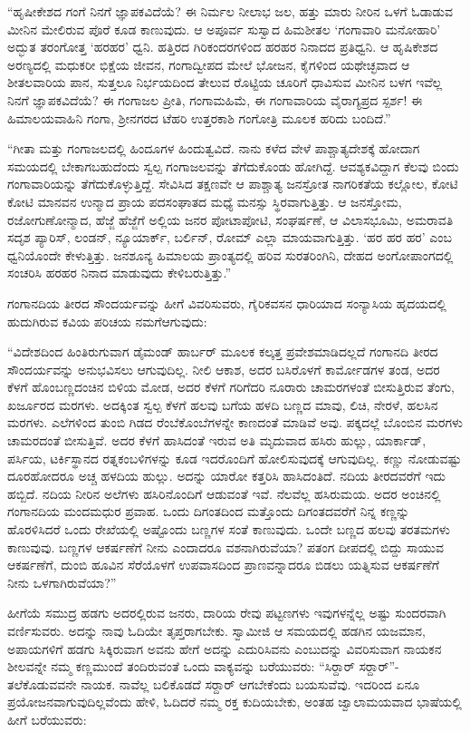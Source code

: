  “ಹೃಷೀಕೇಶದ ಗಂಗೆ ನಿನಗೆ ಜ್ಞಾಪಕವಿದೆಯೆ? ಈ ನಿರ್ಮಲ ನೀಲಾಭ ಜಲ, ಹತ್ತು ಮಾರು ನೀರಿನ ಒಳಗೆ ಓಡಾಡುವ ಮೀನಿನ ಮೇಲಿರುವ ಪೊರೆ ಕೂಡ ಕಾಣುವುದು. ಆ ಅಪೂರ್ವ ಸುಸ್ವಾದ ಹಿಮಶೀತಲ ‘ಗಂಗಾವಾರಿ ಮನೋಹಾರಿ’ ಅದ್ಭುತ ತರಂಗೋತ್ತ ‘ಹರಹರ’ ಧ್ವನಿ. ಹತ್ತಿರದ ಗಿರಿಕಂದರಗಳಿಂದ ಹರಹರ ನಿನಾದದ ಪ್ರತಿಧ್ವನಿ. ಆ ಹೃಷಿಕೇಶದ ಅರಣ್ಯದಲ್ಲಿ ಮಧುಕರೀ ಭಿಕ್ಷೆಯ ಜೀವನ, ಗಂಗಾದ್ವೀಪದ ಮೇಲೆ ಭೋಜನ, ಕೈಗಳಿಂದ ಯಥೇಚ್ಛವಾದ ಆ ಶೀತಲವಾರಿಯ ಪಾನ, ಸುತ್ತಲೂ ನಿರ್ಭಯದಿಂದ ತೇಲುವ ರೊಟ್ಟಿಯ ಚೂರಿಗೆ ಧಾವಿಸುವ ಮೀನಿನ ಬಳಗ ಇವೆಲ್ಲ ನಿನಗೆ ಜ್ಞಾಪಕವಿದೆಯೆ? ಈ ಗಂಗಾಜಲ ಪ್ರೀತಿ, ಗಂಗಾಮಹಿಮೆ, ಈ ಗಂಗಾವಾರಿಯ ವೈರಾಗ್ಯಪ್ರದ ಸ್ಪರ್ಶ! ಈ ಹಿಮಾಲಯವಾಹಿನಿ ಗಂಗಾ, ಶ‍್ರೀನಗರದ ಟೆಹರಿ ಉತ್ತರಕಾಶಿ ಗಂಗೋತ್ರಿ ಮೂಲಕ ಹರಿದು ಬಂದಿದೆ.” 

 “ಗೀತಾ ಮತ್ತು ಗಂಗಾಜಲದಲ್ಲಿ ಹಿಂದೂಗಳ ಹಿಂದುತ್ವವಿದೆ. ನಾನು ಕಳೆದ ವೇಳೆ ಪಾಶ್ಚಾತ್ಯದೇಶಕ್ಕೆ ಹೋದಾಗ ಸಮಯದಲ್ಲಿ ಬೇಕಾಗಬಹುದೆಂದು ಸ್ವಲ್ಪ ಗಂಗಾಜಲವನ್ನು ತೆಗೆದುಕೊಂಡು ಹೋಗಿದ್ದೆ. ಆವಶ್ಯಕವಿದ್ದಾಗ ಕೆಲವು ಬಿಂದು ಗಂಗಾವಾರಿಯನ್ನು ತೆಗೆದುಕೊಳ್ಳುತ್ತಿದ್ದೆ. ಸೇವಿಸಿದ ತಕ್ಷಣವೇ ಆ ಪಾಶ್ಚಾತ್ಯ ಜನಸ್ರೋತ ನಾಗರಿಕತೆಯ ಕಲ್ಲೋಲ, ಕೋಟಿ ಕೋಟಿ ಮಾನವನ ಉನ್ಮಾದ ಪ್ರಾಯ ಪದಸಂಘಾತದ ಮಧ್ಯೆ ಮನಸ್ಸು ಸ್ಥಿರವಾಗುತ್ತಿತ್ತು. ಆ ಜನಸ್ತೋಮ, ರಜೋಗುಣೋನ್ಮಾದ, ಹೆಜ್ಜೆ ಹೆಜ್ಜೆಗೆ ಅಲ್ಲಿಯ ಜನರ ಪೋಟಾಪೋಟಿ, ಸಂಘರ್ಷಣೆ, ಆ ವಿಲಾಸಭೂಮಿ, ಅಮರಾವತಿ ಸದೃಶ ಪ್ಯಾರಿಸ್, ಲಂಡನ್, ನ್ಯೂಯಾರ್ಕ್, ಬರ್ಲಿನ್, ರೋಮ್ ಎಲ್ಲಾ ಮಾಯವಾಗುತ್ತಿತ್ತು. ‘ಹರ ಹರ ಹರ’ ಎಂಬ ಧ್ವನಿಯೊಂದೇ ಕೇಳುತ್ತಿತ್ತು. ಜನಶೂನ್ಯ ಹಿಮಾಲಯ ಪ್ರಾಂತ್ಯದಲ್ಲಿ ಹರಿವ ಸುರತರಿಂಗಿನಿ, ದೇಹದ ಅಂಗೋಪಾಂಗದಲ್ಲಿ ಸಂಚರಿಸಿ ಹರಹರ ನಿನಾದ ಮಾಡುವುದು ಕೇಳಿಬರುತ್ತಿತ್ತು.” 

 ಗಂಗಾನದಿಯ ತೀರದ ಸೌಂದರ್ಯವನ್ನು ಹೀಗೆ ವಿವರಿಸುವರು, ಗೈರಿಕವಸನ ಧಾರಿಯಾದ ಸಂನ್ಯಾಸಿಯ ಹೃದಯದಲ್ಲಿ ಹುದುಗಿರುವ ಕವಿಯ ಪರಿಚಯ ನಮಗೆ\break ಆಗುವುದು: 

 “ವಿದೇಶದಿಂದ ಹಿಂತಿರುಗುವಾಗ ಡೈಮಂಡ್ ಹಾರ್ಬರ್ ಮೂಲಕ ಕಲ್ಕತ್ತ ಪ್ರವೇಶಮಾಡಿದಲ್ಲದೆ ಗಂಗಾನದಿ ತೀರದ ಸೌಂದರ್ಯವನ್ನು ಅನುಭವಿಸಲು ಆಗುವುದಿಲ್ಲ. ನೀಲಿ ಆಕಾಶ, ಅದರ ಬಸಿರೊಳಗೆ ಕಾರ್ಮೋಡಗಳ ತಂಡ, ಅದರ ಕೆಳಗೆ ಹೊಂಬಣ್ಣದಂಚಿನ ಬಿಳಿಯ ಮೋಡ, ಅದರ ಕೆಳಗೆ ಗರಿಗೆದರಿ ನೂರಾರು ಚಾಮರಗಳಂತೆ ಬೀಸುತ್ತಿರುವ ತೆಂಗು, ಖರ್ಜೂರದ ಮರಗಳು. ಅದಕ್ಕಿಂತ ಸ್ವಲ್ಪ ಕೆಳಗೆ ಹಲವು ಬಗೆಯ ಹಳದಿ ಬಣ್ಣದ ಮಾವು, ಲಿಚಿ, ನೇರಳೆ, ಹಲಸಿನ ಮರಗಳು. ಎಲೆಗಳಿಂದ ತುಂಬಿ ಗಿಡದ ರೆಂಬೆಕೊಂಬೆಗಳನ್ನೇ ಕಾಣದಂತೆ ಮಾಡಿವೆ ಅವು. ಪಕ್ಕದಲ್ಲೆ ಬೊಂಬಿನ ಮರಗಳು ಚಾಮರದಂತೆ ಬೀಸುತ್ತಿವೆ. ಅದರ ಕೆಳಗೆ ಹಾಸಿದಂತೆ ಇರುವ ಅತಿ ಮೃದುವಾದ ಹಸಿರು ಹುಲ್ಲು, ಯಾರ್ಕಾಡ್, ಪರ್ಸಿಯ, ಟರ್ಕಿಸ್ಥಾನದ ರತ್ನಕಂಬಳಿಗಳನ್ನು ಕೂಡ ಇದರೊಂದಿಗೆ ಹೋಲಿಸುವುದಕ್ಕೆ ಆಗುವುದಿಲ್ಲ. ಕಣ್ಣು ನೋಡುವಷ್ಟು ದೂರಹೋದರೂ ಅಚ್ಚ ಹಳದಿಯ ಹುಲ್ಲು. ಅದನ್ನು ಯಾರೋ ಕತ್ತರಿಸಿ ಹಾಸಿದಂತಿದೆ. ನದಿಯ ತೀರದವರೆಗೆ ಇದು ಹಬ್ಬಿದೆ. ನದಿಯ ನೀರಿನ ಅಲೆಗಳು ಹಸಿರಿನೊಂದಿಗೆ ಆಡುವಂತೆ ಇವೆ. ನೆಲವೆಲ್ಲ ಹಸಿರುಮಯ. ಅದರ ಅಂಚಿನಲ್ಲಿ ಗಂಗಾನದಿಯ ಮಂದಮಧುರ ಪ್ರವಾಹ. ಒಂದು ದಿಗಂತದಿಂದ ಮತ್ತೊಂದು ದಿಗಂತದವರೆಗೆ ನಿನ್ನ ಕಣ್ಣನ್ನು ಹೊರಳಿಸಿದರೆ ಒಂದು ರೇಖೆಯಲ್ಲಿ ಅಷ್ಟೊಂದು ಬಣ್ಣಗಳ ಸಂತೆ ಕಾಣುವುದು. ಒಂದೇ ಬಣ್ಣದ ಹಲವು ತರತಮಗಳು ಕಾಣುವುವು. ಬಣ್ಣಗಳ ಆಕರ್ಷಣೆಗೆ ನೀನು ಎಂದಾದರೂ ವಶನಾಗಿರುವೆಯಾ? ಪತಂಗ ದೀಪದಲ್ಲಿ ಬಿದ್ದು ಸಾಯುವ ಆಕರ್ಷಣೆಗೆ, ದುಂಬಿ ಹೂವಿನ ಸೆರೆಯೊಳಗೆ ಉಪವಾಸದಿಂದ ಪ್ರಾಣವನ್ನಾದರೂ ಬಿಡಲು ಯತ್ನಿಸುವ ಆಕರ್ಷಣೆಗೆ ನೀನು ಒಳಗಾಗಿರುವೆಯಾ?” 

 ಹೀಗೆಯೆ ಸಮುದ್ರ ಹಡಗು ಅದರಲ್ಲಿರುವ ಜನರು, ದಾರಿಯ ರೇವು ಪಟ್ಟಣಗಳು ಇವುಗಳನ್ನೆಲ್ಲ ಅಷ್ಟು ಸುಂದರವಾಗಿ ವರ್ಣಿಸುವರು. ಅದನ್ನು ನಾವು ಓದಿಯೇ ತೃಪ್ತರಾಗಬೇಕು. ಸ್ವಾಮೀಜಿ ಆ ಸಮಯದಲ್ಲಿ ಹಡಗಿನ ಯಜಮಾನ, ಅಪಾಯಗಳಿಗೆ ಹಡಗು ಸಿಕ್ಕಿರುವಾಗ ಅವನು ಹೇಗೆ ಅದನ್ನು ಎದುರಿಸಿವನು ಎಂಬುದನ್ನು ವಿವರಿಸುವಾಗ ನಾಯಕನ ಶೀಲವನ್ನೇ ನಮ್ಮ ಕಣ್ಣಮುಂದೆ ತಂದಿರುವಂತೆ ಒಂದು ವಾಕ್ಯವನ್ನು ಬರೆಯುವರು: “ಸಿರ್‍ದಾರ್ ಸರ್‍ದಾರ್”- ತಲೆಕೊಡುವವನೇ ನಾಯಕ. ನಾವೆಲ್ಲ ಬಲಿಕೊಡದೆ ಸರ್‍ದಾರ್ ಆಗಬೇಕೆಂದು ಬಯಸುವೆವು. ಇದರಿಂದ ಏನೂ ಪ್ರಯೋಜನವಾಗುವುದಿಲ್ಲವೆಂದು ಹೇಳಿ, ಓದಿದರೆ ನಮ್ಮ ರಕ್ತ ಕುದಿಯಬೇಕು, ಅಂತಹ ಜ್ವಾಲಾಮಯವಾದ ಭಾಷೆಯಲ್ಲಿ ಹೀಗೆ ಬರೆಯುವರು: 

